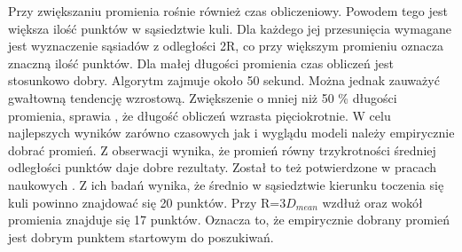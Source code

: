 Przy zwiększaniu promienia rośnie również czas obliczeniowy. Powodem tego jest większa ilość punktów w sąsiedztwie kuli. Dla każdego jej przesunięcia wymagane jest wyznaczenie sąsiadów z odległości 2R, co przy większym promieniu oznacza znaczną ilość punktów. Dla małej długości promienia czas obliczeń jest stosunkowo dobry. Algorytm zajmuje około 50 sekund. Można jednak zauważyć gwałtowną tendencję wzrostową. Zwiększenie o mniej niż 50 \% długości promienia, sprawia , że długość obliczeń wzrasta pięciokrotnie. W celu najlepszych wyników zarówno czasowych jak i wyglądu modeli należy empirycznie dobrać promień. Z obserwacji wynika, że promień równy trzykrotności średniej odległości punktów daje dobre rezultaty. Został to też potwierdzone w pracach naukowych \cite{mittleman1999ball}. Z ich badań wynika, że średnio w sąsiedztwie kierunku toczenia się kuli powinno znajdować się 20 punktów. Przy R=3$D_{mean}$ wzdłuż oraz wokół promienia znajduje się 17 punktów. Oznacza to, że empirycznie dobrany promień jest dobrym punktem startowym do poszukiwań.

